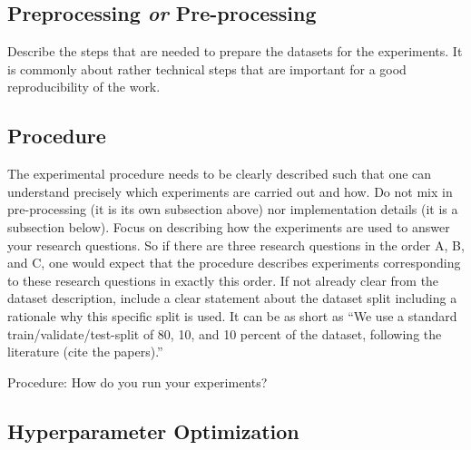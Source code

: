 \documentclass[sigconf, nonacm]{acmart}
\begin{document}
\subsection{Preprocessing \textit{or} Pre-processing}
\label{sec:preprocessing}

Describe the steps that are needed to prepare the datasets for the experiments.
It is commonly about rather technical steps that are important for a good reproducibility of the work.

\subsection{Procedure}
\label{sec:procedure}

\begin{tcolorbox}
    [title=Procedure: What needs to be described to understand the experiments.]
    The experimental procedure needs to be clearly described such that one can understand precisely which experiments are carried out and how. 
    Do not mix in pre-processing (it is its own subsection above) nor implementation details (it is a subsection below). 
    Focus on describing how the experiments are used to answer your research questions. 
    So if there are three research questions in the order A, B, and C, one would expect that the procedure describes experiments corresponding to these research questions in exactly this order. 
    If not already clear from the dataset description, include a clear statement about the dataset split including a rationale why this specific split is used. 
    It can be as short as ``We use a standard train/validate/test-split of 80, 10, and 10 percent of the dataset, following the literature (cite the papers).''

\end{tcolorbox}


Procedure: How do you run your experiments?

\subsection{Hyperparameter Optimization}
\label{sec:hyperparameteroptimization}

\end{document}
